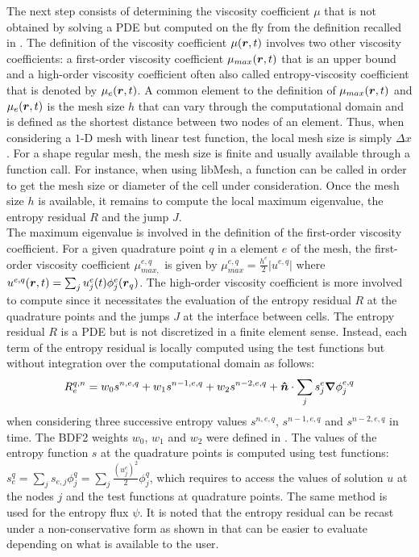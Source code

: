 The next step consists of determining the viscosity coefficient $\mu$ that is not obtained by solving a PDE but computed on the fly from the definition recalled in . The definition of the viscosity coefficient $\mu(\boldsymbol r,t)$ involves two other viscosity coefficients: a first-order viscosity coefficient $\mu_{max}(\boldsymbol r,t)$ that is an upper bound and a high-order viscosity coefficient often also called entropy-viscosity coefficient that is denoted by $\mu_e(\boldsymbol r,t)$. A common element to the definition of $\mu_{max}(\boldsymbol r,t)$ and $\mu_e(\boldsymbol r,t)$ is the mesh size $h$ that can vary through the computational domain and is defined as the shortest distance between two nodes of an element. Thus, when considering a $1$-D mesh with linear test function, the local mesh size is simply $\Delta x$. For a shape regular mesh, the mesh size is finite and usually available through a function call. For instance, when using libMesh, a function can be called in order to get the mesh size or diameter of the cell under consideration. Once the mesh size $h$ is available, it remains to compute the local maximum eigenvalue, the entropy residual $R$ and the jump $J$. \\
The maximum eigenvalue is involved in the definition of the first-order viscosity coefficient. For a given quadrature point $q$ in a element $e$ of the mesh, the first-order viscosity coefficient $\mu_{max,}^{e,q}$ is given by  $\mu_{max}^{e,q} = \frac{h^e}{2} | u^{e,q} |$ where $u^{e,q}(\boldsymbol r,t) = \sum_j u_{j}^e(t) \phi^e_j(\boldsymbol r_q)$. The high-order viscosity coefficient is more involved to compute since it necessitates the evaluation of the entropy residual $R$ at the quadrature points and the jumps $J$ at the interface between cells. The entropy residual $R$ is a PDE but is not discretized in a finite element sense. Instead, each term of the entropy residual is locally computed using the test functions but without integration over the computational domain as follows:
%
\begin{equation}\label{eq:res_disc_sct2}
R_{e}^{q,n} = w_0 s^{n,e,q} + w_1 s^{n-1,e,q} + w_2 s^{n-2,e,q} +  \boldsymbol{\hat{n}} \cdot  \sum_j s_{j}^e \boldsymbol{\nabla} \phi^{e,q}_j
\end{equation}
when considering three successive entropy values $s^{n,e,q}$, $s^{n-1,e,q}$ and $s^{n-2,e,q}$ in time. The BDF2 weights $w_0$, $w_1$ and $w_2$ were defined in . The values of the entropy function $s$ at the quadrature points is computed using test functions:   $s^q_e = \sum_j s_{e,j} \phi^q_j = \sum_j \frac{(u_{j}^e)^2}{2} \phi^q_j$, which requires to access the values of solution $u$ at the nodes $j$ and the test functions at quadrature points. The same method is used for the entropy flux $\psi$. It is noted that the entropy residual can be recast under a non-conservative form as shown in  that can be easier to evaluate depending on what is available to the user.
